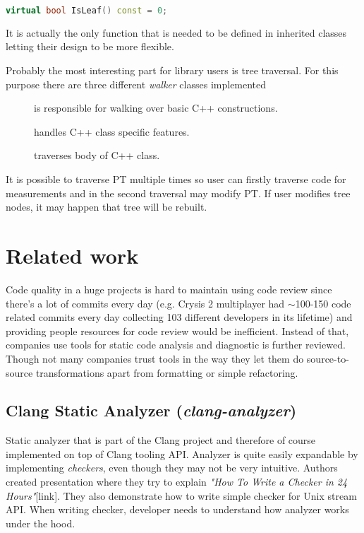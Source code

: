 \begin{lstlisting}[language=C++]
virtual bool IsLeaf() const = 0;
\end{lstlisting}

It is actually the only function that is needed to be defined in inherited classes letting their design to be more flexible.

Probably the most interesting part for library users is tree traversal. For this purpose there are three different \emph{walker} classes implemented

\begin{description}
\item[] is responsible for walking over basic C++ constructions.
\item[] handles C++ class specific features.
\item[] traverses body of C++ class.
\end{description}

It is possible to traverse PT multiple times so user can firstly traverse code for measurements and in the second traversal may modify PT. If user modifies tree nodes, it may happen that tree will be rebuilt.

\section{Related work}
Code quality in a huge projects is hard to maintain using code review since there's a lot of commits every day (e.g. Crysis 2 multiplayer had $\sim$100-150 code related commits every day collecting 103 different developers in its lifetime) and providing people resources for code review would be inefficient. Instead of that, companies use tools for static code analysis and diagnostic is further reviewed. Though not many companies trust tools in the way they let them do source-to-source transformations apart from formatting or simple refactoring.

\subsection{Clang Static Analyzer (\emph{clang-analyzer})}
Static analyzer that is part of the Clang project and therefore of course implemented on top of Clang tooling API. Analyzer is quite easily expandable by implementing \emph{checkers}, even though they may not be very intuitive. Authors created presentation where they try to explain \emph{"How To Write a Checker in 24 Hours"}[link]. They also demonstrate how to write simple checker for  Unix stream API. When writing checker, developer needs to understand how analyzer works under the hood.

